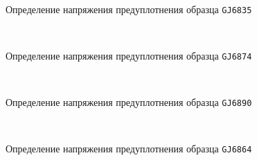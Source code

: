 \begin{figure}
    {\centering
      \small
      \hfill 
      \\
      \hfill  
      \hfill 
      }
      \caption{Определение напряжения предуплотнения образца \texttt{GJ6835}}
      \label{img:6835}
    \end{figure}
    
    \begin{figure}
        {\centering
        \small
          \hfill 
          \\
          \hfill  
          \hfill 
          }
          \caption{Определение напряжения предуплотнения образца \texttt{GJ6874}}
          \label{img:6874}
    \end{figure}
    
    \begin{figure}
        {\centering
        \small
            \hfill 
            \\
            \hfill  
            \hfill 
            }
            \caption{Определение напряжения предуплотнения образца \texttt{GJ6890}}
            \label{img:6890}
    \end{figure}
    
    
    \begin{figure}
        {\centering
        \small
            \hfill 
            \\
            \hfill  
            \hfill 
            }
            \caption{Определение напряжения предуплотнения образца \texttt{GJ6864}}
            \label{img:6864}
    \end{figure}
    
